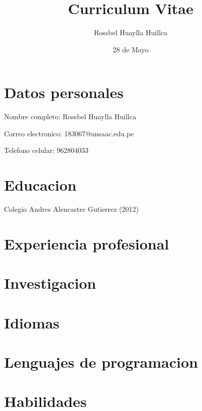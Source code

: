 \documentclass[11pt,letterpaper]{article}
\author{Rossbel Huaylla Huillca}
\title{Curriculum Vitae}
\date {28 de Mayo}
\begin{document}

\maketitle %
\section{Datos personales}
Nombre completo: Rossbel Huaylla Huillca

Correo electronico: 183067@unsaac.edu.pe

Telefono celular: 962804033

\section{Educacion}
Colegio Andres Alencastre Gutierrez (2012)



\section{Experiencia profesional}

\section{Investigacion}

\section{Idiomas}

\section{Lenguajes de programacion}

\section{Habilidades}
\end{document}
